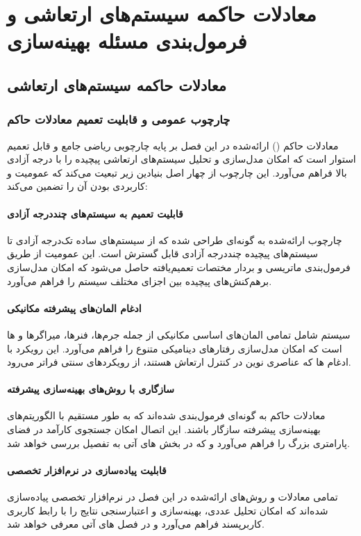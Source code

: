 \chapter{معادلات حاکمه سیستم‌های ارتعاشی و فرمول‌بندی مسئله بهینه‌سازی}

\section{معادلات حاکمه سیستم‌های ارتعاشی}
\subsection{چارچوب عمومی و قابلیت تعمیم معادلات حاکم}

معادلات حاکم () ارائه‌شده در این فصل بر پایه چارچوبی ریاضی جامع و قابل تعمیم استوار است که امکان مدل‌سازی و تحلیل سیستم‌های ارتعاشی پیچیده را با درجه آزادی بالا فراهم می‌آورد. این چارچوب از چهار اصل بنیادین زیر تبعیت می‌کند که عمومیت و کاربردی بودن آن را تضمین می‌کند:

\subsubsection{قابلیت تعمیم به سیستم‌های چنددرجه آزادی}
چارچوب ارائه‌شده به گونه‌ای طراحی شده که از سیستم‌های ساده تک‌درجه آزادی تا سیستم‌های پیچیده چنددرجه آزادی قابل گسترش است. این عمومیت از طریق فرمول‌بندی ماتریسی و بردار مختصات تعمیم‌یافته حاصل می‌شود که امکان مدل‌سازی برهم‌کنش‌های پیچیده بین اجزای مختلف سیستم را فراهم می‌آورد.

\subsubsection{ادغام المان‌های پیشرفته مکانیکی}
سیستم شامل تمامی المان‌های اساسی مکانیکی از جمله جرم‌ها، فنرها، میراگرها و ها است که امکان مدل‌سازی رفتارهای دینامیکی متنوع را فراهم می‌آورد. این رویکرد با ادغام ها که عناصری نوین در کنترل ارتعاش هستند، از رویکردهای سنتی فراتر می‌رود.

\subsubsection{سازگاری با روش‌های بهینه‌سازی پیشرفته}
معادلات حاکم به گونه‌ای فرمول‌بندی شده‌اند که به طور مستقیم با الگوریتم‌های بهینه‌سازی پیشرفته سازگار باشند. این اتصال امکان جستجوی کارآمد در فضای پارامتری بزرگ را فراهم می‌آورد و که در بخش های آتی به تفصیل بررسی خواهد شد.

\subsubsection{قابلیت پیاده‌سازی در نرم‌افزار تخصصی}
تمامی معادلات و روش‌های ارائه‌شده در این فصل در نرم‌افزار تخصصی  پیاده‌سازی شده‌اند که امکان تحلیل عددی، بهینه‌سازی و اعتبارسنجی نتایج را با رابط کاربری کاربرپسند فراهم می‌آورد و در فصل های آتی معرفی خواهد شد.

